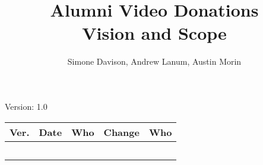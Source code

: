 \documentclass[letterpaper,12pt]{article}
\title{Alumni Video Donations\\Vision and Scope}
\author{Simone Davison, Andrew Lanum, Austin Morin}
\begin{document}
\maketitle

\begin{center}
  Version: 1.0
\end{center}

\vfill
\begin{tabularx}{\linewidth}{|l|l|l|X|l|}\hline
Ver. & Date & Who & Change & Who \\\hline
     &      &     &        &     \\\hline
     &      &     &        &     \\\hline
     &      &     &        &     \\\hline
     &      &     &        &     \\\hline
     &      &     &        &     \\\hline
\end{tabularx}
\newpage







\end{document}
